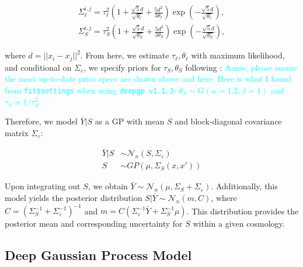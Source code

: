 \documentclass[11pt]{article}
\begin{document}
\begin{align}
\Sigma_\ell^{i,j} = \tau_\ell^2  \left( 1 + \frac{\sqrt{5}d}{\sqrt{\theta_\ell}} + \frac{5d^2}{3\theta_\ell}\right) \exp\left(-\frac{\sqrt{5}d}{\sqrt{\theta_\ell}}\right),\\
\Sigma_S^{i,j} = \tau_S^2  \left( 1 + \frac{\sqrt{5}d}{\sqrt{\theta_S}} + \frac{5d^2}{3\theta_S}\right) \exp\left(-\frac{\sqrt{5}d}{\sqrt{\theta_S}}\right),
\end{align}

where $d=||x_i-x_j||^2$. From here, we estimate $\tau_\ell, \theta_\ell$ with maximum likelihood, and conditional on $\Sigma_\varepsilon$, we specify priors for $\tau_S, \theta_S$ following \cite{sauer2023active}: \textcolor{cyan}{Annie, please ensure the most up-to-date prior specs are shown above and here. Here is what I found from \texttt{fit\$settings} when using \texttt{deepgp v1.1.3}: $\theta_S \sim G(\alpha=1.2, \beta=1)$ and $\tau_S \propto 1/\tau_S^2$.}


Therefore, we model $\bar Y|S$ as a GP with mean $S$ and block-diagonal covariance matrix $\Sigma_\varepsilon$:

\begin{align}
\bar Y|S &\sim \mathcal{N}_n(S,\Sigma_\varepsilon) \\
S &\sim GP\left(\mu, \Sigma_S(x,x')\right)
\end{align}

Upon integrating out $S$, we obtain $\bar Y \sim \mathcal{N}_n(\mu, \Sigma_S+\Sigma_\varepsilon)$. Additionally, this model yields the posterior distribution $S|\bar Y \sim \mathcal{N}_n(m, C)$, where $C=\left(\Sigma_S^{-1}+\Sigma_\varepsilon^{-1}\right)^{-1}$ and $m=C\left(\Sigma_\varepsilon^{-1}\bar Y+\Sigma_S^{-1}\mu\right)$. 
This distribution provides the posterior mean and corresponding uncertainty for $S$ within a given cosmology. 

\subsection{Deep Gaussian Process Model}
\end{document}
